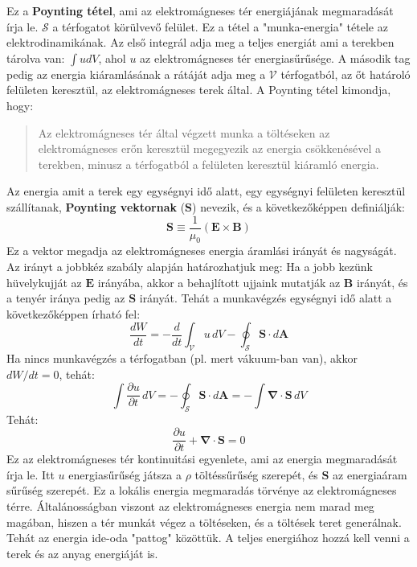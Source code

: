 \documentclass[../main.tex]{subfiles}
\begin{document}
Ez a \textbf{Poynting tétel}, ami az elektromágneses tér energiájának megmaradását írja le. $\mathcal{S}$ a térfogatot körülvevő felület. Ez a tétel a "munka-energia" tétele az elektrodinamikának.
Az első integrál adja meg a teljes energiát ami a terekben tárolva van: $\int u dV$, ahol $u$ az elektromágneses tér energiasűrűsége. A második tag pedig az energia kiáramlásának a rátáját adja meg a $\mathcal{V}$ térfogatból,
az őt határoló felületen keresztül, az elektromágneses terek által. A Poynting tétel kimondja, hogy:
\begin{quote}
    Az elektromágneses tér által végzett munka a töltéseken az elektromágneses erőn keresztül megegyezik az energia csökkenésével a terekben, minusz a térfogatból a felületen keresztül kiáramló energia.
\end{quote}
Az energia amit a terek egy egységnyi idő alatt, egy egységnyi felületen keresztül szállítanak, \textbf{Poynting vektornak} ($\mathbf{S}$) nevezik, és a következőképpen definiálják:
\begin{equation}
    \boxed{\mathbf{S} \equiv \frac{1}{\mu_0} (\mathbf{E} \times \mathbf{B})}
\end{equation}
Ez a vektor megadja az elektromágneses energia áramlási irányát és nagyságát. Az irányt a jobbkéz szabály alapján határozhatjuk meg: Ha a jobb kezünk hüvelykujját az $\mathbf{E}$ irányába,
akkor a behajlított ujjaink mutatják az $\mathbf{B}$ irányát, és a tenyér iránya pedig az $\mathbf{S}$ irányát.
Tehát a munkavégzés egységnyi idő alatt a következőképpen írható fel:
\begin{equation}
    \boxed{\frac{dW}{dt} = - \frac{d}{dt} \int_{\mathcal{V}} u \, dV - \oint_{\mathcal{S}} \mathbf{S} \cdot d\mathbf{A}}
\end{equation}
Ha nincs munkavégzés a térfogatban (pl. mert vákuum-ban van), akkor $dW/dt = 0$, tehát:
\begin{equation}
    \int \frac{\partial u}{\partial t} \, dV = - \oint_{\mathcal{S}} \mathbf{S} \cdot d\mathbf{A} = - \int \boldsymbol{\nabla} \cdot \mathbf{S} \, dV
\end{equation}
Tehát:
\begin{equation}
    \boxed{\frac{\partial u}{\partial t} + \boldsymbol{\nabla} \cdot \mathbf{S} = 0}
\end{equation}
Ez az elektromágneses tér kontinuitási egyenlete, ami az energia megmaradását írja le. Itt $u$ energiasűrűség játsza a $\rho$ töltéssűrűség szerepét, és $\mathbf{S}$ az energiaáram sűrűség szerepét.
Ez a lokális energia megmaradás törvénye az elektromágneses térre. Általánosságban viszont az elektromágneses energia nem marad meg magában, hiszen a tér munkát végez a töltéseken,
és a töltések teret generálnak. Tehát az energia ide-oda "pattog" közöttük. A teljes energiához hozzá kell venni a terek és az anyag energiáját is.
\end{document}
